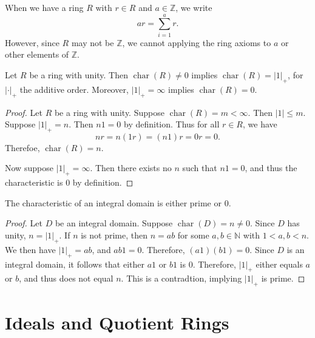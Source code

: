 \begin{remark}
	When we have a ring $R$ with $r\in R$ and $a\in\mathbb{Z}$, we write
	\[
		ar=\sum_{i=1}^{a} r
	.\]
	However, since $R$ may not be $\mathbb{Z}$, we cannot applying the ring axioms to $a$ or other elements of $\mathbb{Z}$.
\end{remark}
\begin{theorem}\label{thm:RINKSJA}
	Let $R$ be a ring with unity. Then $\operatorname{char}(R)\neq 0$ implies  $\operatorname{char}(R) =\left| 1 \right|_{+} $, for $\left| \cdot  \right| _+$ the additive order. Moreover, $\left| 1 \right| _+=\infty$ implies $\operatorname{char}(R) =0$.
\end{theorem}
\begin{proof}
	Let $R$ be a ring with unity. Suppose $\operatorname{char}(R) =m<\infty$. Then $\left| 1 \right| \leq m$. Suppose $\left| 1 \right| _+=n$. Then $n1=0$ by definition. Thus for all  $r\in R$, we have
	\[
		nr=n(1r)=(n1)r=0r=0
	.\]
	Therefoe, $\operatorname{char}(R) =n$.

	Now suppose $\left| 1 \right| _+=\infty$. Then there exists no $n$ such that $n1=0$, and thus the characteristic is $0$ by definition.
\end{proof}
\begin{theorem}\label{thm:hsd}
	The characteristic of an integral domain is either prime or $0$.
\end{theorem}
\begin{proof}
	Let $D$ be an integral domain. Suppose $\operatorname{char}(D) =n\neq 0$. Since $D$ has unity, $n =\left| 1 \right| _+$. If $n$ is not prime, then $n=ab$ for some $a,b\in\mathbb{N}$ with $1<a,b<n$. We then have $\left| 1 \right|_+=ab$, and $ab1=0$. Therefore, $(a1)(b1)=0$. Since $D$ is an integral domain, it follows that either $a1$ or $b1$ is $0$. Therefore, $\left| 1 \right| _+$ either equals $a$ or $b$, and thus does not equal $n$. This is a contradtion, implying $\left| 1 \right| _+$ is prime.
\end{proof}
\chapter{Ideals and Quotient Rings}
